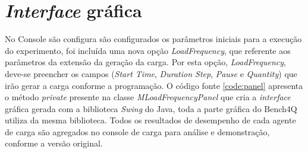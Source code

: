 \section{\textit{Interface} gráfica}

No Console são configura são configurados os parâmetros iniciais para a execução do experimento, foi incluída uma nova opção \textit{LoadFrequency}, que referente aos parâmetros da extensão da geração da carga. Por esta opção, \textit{LoadFrequency}, deve-se preencher os campos (\textit{Start Time}, \textit{Duration Step}, \textit{Pause} e \textit{Quantity}) que irão gerar a carga conforme a programação. O código fonte \ref{code:panel} apresenta o método \textit{private} presente na classe \textit{MLoadFrequencyPanel} que cria a \textit{interface} gráfica gerada com a biblioteca \textit{Swing} do Java, toda a parte gráfica do Bench4Q utiliza da mesma biblioteca. Todos os resultados de desempenho de cada agente de carga são agregados no console de carga para análise e demonstração, conforme a versão original.

